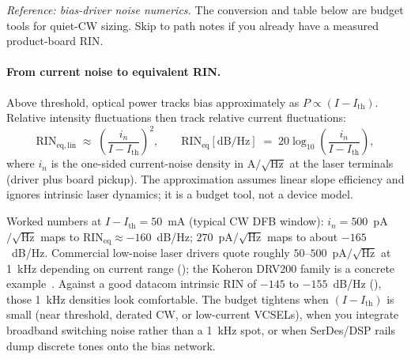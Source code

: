 \textit{Reference: bias-driver noise numerics.} The conversion and table below
are budget tools for quiet-CW sizing. Skip to path notes if you already have a
measured product-board RIN.

\paragraph{From current noise to equivalent RIN.}
Above threshold, optical power tracks bias approximately as
$P\propto(I-I_\mathrm{th})$. Relative intensity fluctuations then track relative
current fluctuations:
\[
\mathrm{RIN}_{\mathrm{eq,lin}}
\;\approx\;
\left(\frac{i_n}{I-I_\mathrm{th}}\right)^{\!2},
\qquad
\mathrm{RIN}_{\mathrm{eq}}[\mathrm{dB/Hz}]
\;=\;
20\log_{10}\!\left(\frac{i_n}{I-I_\mathrm{th}}\right),
\]
where $i_n$ is the one-sided current-noise density in A$/\sqrt{\mathrm{Hz}}$ at the
laser terminals (driver plus board pickup). The approximation assumes linear slope
efficiency and ignores intrinsic laser dynamics; it is a budget tool, not a device
model.

Worked numbers at $I-I_\mathrm{th}=50$~mA (typical CW DFB window): $i_n=500$~pA$/\sqrt{\mathrm{Hz}}$
maps to $\mathrm{RIN}_{\mathrm{eq}}\approx-160$~dB/Hz; $270$~pA$/\sqrt{\mathrm{Hz}}$
maps to about $-165$~dB/Hz. Commercial low-noise laser drivers quote roughly
$50$--$500$~pA$/\sqrt{\mathrm{Hz}}$ at 1~kHz depending on current range
(); the Koheron DRV200 family is a concrete
example~. Against a good datacom intrinsic RIN of
$-145$ to $-155$~dB/Hz (), those 1~kHz densities look
comfortable. The budget tightens when $(I-I_\mathrm{th})$ is small (near
threshold, derated CW, or low-current VCSELs), when you integrate broadband
switching noise rather than a 1~kHz spot, or when SerDes/DSP rails dump discrete
tones onto the bias network.

